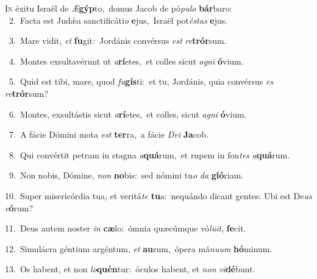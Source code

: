 \lettrine{\initial\textcolor{\initialcolor}{I}}{n} éxitu Israël de \textit{Æ}\-\textbf{gýp}to,~\star domus Jacob de pó\-\textit{pu}\-\textit{lo} \textbf{bár}\-baro:\\
{\numbfont\textcolor{\numbcolor}{~2.}}~Facta est Judǽa sanctificáti\textit{o} \textbf{e}\-jus,~\star Israël pot\-\textit{és}\-\textit{tas} \textbf{e}\-jus.\par
{\numbfont\textcolor{\numbcolor}{~3.}}~Mare vidit, \textit{et} \textbf{fu}\-git:~\star Jordánis convérsus \textit{est} \textit{re}\-\textbf{trór}sum.\par
{\numbfont\textcolor{\numbcolor}{~4.}}~Montes exsultavérunt ut \textit{a}\-\textbf{rí}etes,~\star et colles sicut \textit{a}\-\textit{gni} \textbf{ó}\-vium.\par
{\numbfont\textcolor{\numbcolor}{~5.}}~Quid est tibi, mare, quod \textit{fu}\-\textbf{gís}ti:~\star et tu, Jordánis, quia convérsus \textit{es} \textit{re}\-\textbf{trór}sum?\par
{\numbfont\textcolor{\numbcolor}{~6.}}~Montes, exsultástis sicut \textit{a}\-\textbf{rí}etes,~\star et colles, sicut \textit{a}\-\textit{gni} \textbf{ó}\-vium.\par
{\numbfont\textcolor{\numbcolor}{~7.}}~A fácie Dómini mota \textit{est} \textbf{ter}\-ra,~\star a fácie \textit{De}\-\textit{i} \textbf{Ja}\-cob.\par
{\numbfont\textcolor{\numbcolor}{~8.}}~Qui convértit petram in stagna \textit{a}\-\textbf{quá}rum,~\star et rupem in fon\textit{tes} \textit{a}\-\textbf{quá}rum.\par
{\numbfont\textcolor{\numbcolor}{~9.}}~Non nobis, Dómine, \textit{non} \textbf{no}\-bis:~\star sed nómini tu\textit{o} \textit{da} \textbf{gló}\-riam.\par
{\numbfont\textcolor{\numbcolor}{10.}}~Super misericórdia tua, et veritá\textit{te} \textbf{tu}\-a:~\star nequándo dicant gentes: Ubi est De\textit{us} \textit{e}\-\textbf{ó}rum?\par
{\numbfont\textcolor{\numbcolor}{11.}}~Deus autem noster \textit{in} \textbf{cæ}\-lo:~\star ómnia quæcúmque vó\-\textit{lu}\-\textit{it}, \textbf{fe}\-cit.\par
{\numbfont\textcolor{\numbcolor}{12.}}~Simulácra géntium argéntum, \textit{et} \textbf{au}\-rum,~\star ópera má\-\textit{nu}\-\textit{um} \textbf{hó}\-minum.\par
{\numbfont\textcolor{\numbcolor}{13.}}~Os habent, et non \textit{lo}\-\textbf{quén}tur:~\star óculos habent, et \textit{non} \textit{vi}\-\textbf{dé}bunt.\par
